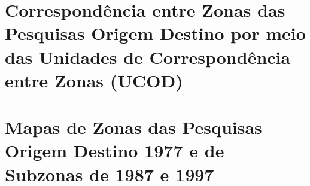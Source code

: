 %
%
%
%
%
%
%
%
%
%
%
%
%
\chapter{Correspondência entre Zonas das Pesquisas Origem Destino por meio das Unidades de Correspondência entre Zonas (UCOD)}\label{chap:anexo_ucod}



\chapter{Mapas de Zonas das Pesquisas Origem Destino 1977 e de Subzonas de 1987 e 1997}\label{chap:anexo_mapas_zonas}




